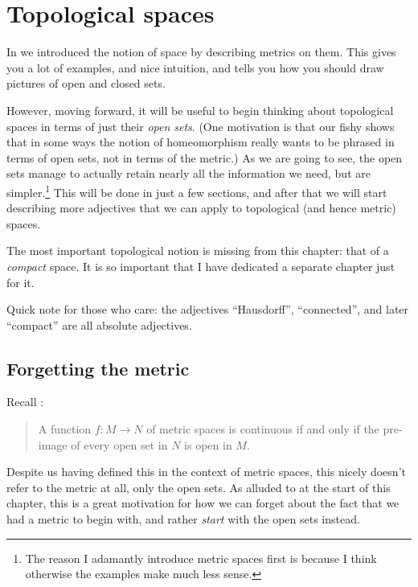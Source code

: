 \chapter{Topological spaces}
\label{ch:top_more}

In  we introduced the notion
of space by describing metrics on them.
This gives you a lot of examples, and nice intuition,
and tells you how you should draw pictures of open and closed sets.

However, moving forward, it will be useful to begin
thinking about topological spaces in terms of just their \emph{open sets}.
(One motivation is that our fishy  shows that
in some ways the notion of homeomorphism really wants
to be phrased in terms of open sets, not in terms of the metric.)
As we are going to see, the open sets manage to actually retain
nearly all the information we need, but are simpler.\footnote{The
	reason I adamantly introduce metric spaces first
	is because I think otherwise the examples make much less sense.}
This will be done in just a few sections,
and after that we will start describing more adjectives
that we can apply to topological (and hence metric) spaces.

The most important topological notion is missing from this chapter:
that of a \emph{compact} space.
It is so important that I have dedicated a separate chapter just for it.

Quick note for those who care:
the adjectives ``Hausdorff'', ``connected'',
and later ``compact'' are all absolute adjectives.



\section{Forgetting the metric}
Recall :
\begin{quote}
	A function $f \colon M \to N$ of metric spaces is continuous
	if and only if the pre-image of every open set in $N$ is open in $M$.
\end{quote}
Despite us having defined this in the context of metric spaces,
this nicely doesn't refer to the metric at all,
only the open sets.
As alluded to at the start of this chapter,
this is a great motivation for how we can forget
about the fact that we had a metric to begin with,
and rather \emph{start} with the open sets instead.

